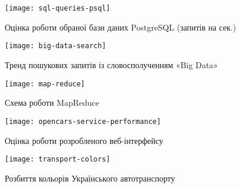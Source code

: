 \chapter{}

\begin{figure}[h]
\centering
\texttt{[image: sql-queries-psql]}
\caption{Оцінка роботи обраної бази даних PostgreSQL (запитів на сек.)}
\label{fig:sql-queries-psql}
\end{figure}

\begin{figure}[h]
\centering
\texttt{[image: big-data-search]}
\caption{Тренд пошукових запитів із словосполученням «Big Data»}
\label{fig:big-data-search}
\end{figure}

\begin{figure}[h]
\centering
\texttt{[image: map-reduce]}
\caption{Схема роботи MapReduce}
\label{fig:map-reduce}
\end{figure}

\begin{figure}[h]
\centering
\texttt{[image: opencars-service-performance]}
\caption{Оцінка роботи розробленого веб-інтерфейсу}
\label{fig:opencars-service-performance}
\end{figure}

\begin{figure}[h]
\centering
\texttt{[image: transport-colors]}
\caption{Розбиття кольорів Українського автотранспорту}
\label{fig:transport-colors}
\end{figure}
